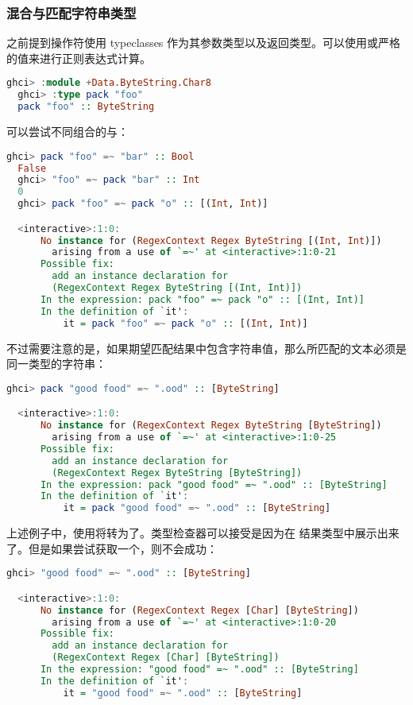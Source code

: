 \documentclass[./main.tex]{subfiles}
\begin{document}
\subsubsection*{混合与匹配字符串类型}

之前提到\acode{=~}操作符使用 typeclasses 作为其参数类型以及返回类型。可以使用或严格
的值来进行正则表达式计算。

\begin{lstlisting}[language=Haskell]
  ghci> :module +Data.ByteString.Char8
  ghci> :type pack "foo"
  pack "foo" :: ByteString
\end{lstlisting}

可以尝试不同组合的与：

\begin{lstlisting}[language=Haskell]
  ghci> pack "foo" =~ "bar" :: Bool
  False
  ghci> "foo" =~ pack "bar" :: Int
  0
  ghci> pack "foo" =~ pack "o" :: [(Int, Int)]

  <interactive>:1:0:
      No instance for (RegexContext Regex ByteString [(Int, Int)])
        arising from a use of `=~' at <interactive>:1:0-21
      Possible fix:
        add an instance declaration for
        (RegexContext Regex ByteString [(Int, Int)])
      In the expression: pack "foo" =~ pack "o" :: [(Int, Int)]
      In the definition of `it':
          it = pack "foo" =~ pack "o" :: [(Int, Int)]
\end{lstlisting}

不过需要注意的是，如果期望匹配结果中包含字符串值，那么所匹配的文本必须是同一类型的字符串：

\begin{lstlisting}[language=Haskell]
  ghci> pack "good food" =~ ".ood" :: [ByteString]

  <interactive>:1:0:
      No instance for (RegexContext Regex ByteString [ByteString])
        arising from a use of `=~' at <interactive>:1:0-25
      Possible fix:
        add an instance declaration for
        (RegexContext Regex ByteString [ByteString])
      In the expression: pack "good food" =~ ".ood" :: [ByteString]
      In the definition of `it':
          it = pack "good food" =~ ".ood" :: [ByteString]
\end{lstlisting}

上述例子中，使用将转为了。类型检查器可以接受是因为在
结果类型中展示出来了。但是如果尝试获取一个，则不会成功：

\begin{lstlisting}[language=Haskell]
  ghci> "good food" =~ ".ood" :: [ByteString]

  <interactive>:1:0:
      No instance for (RegexContext Regex [Char] [ByteString])
        arising from a use of `=~' at <interactive>:1:0-20
      Possible fix:
        add an instance declaration for
        (RegexContext Regex [Char] [ByteString])
      In the expression: "good food" =~ ".ood" :: [ByteString]
      In the definition of `it':
          it = "good food" =~ ".ood" :: [ByteString]
\end{lstlisting}
\end{document}
